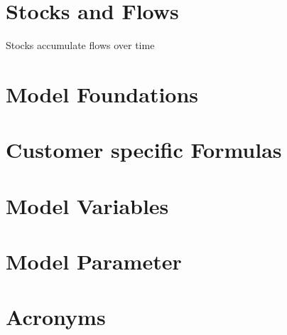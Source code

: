 \section{Stocks and Flows}\label{ch:sfd:sf}

Stocks accumulate flows over time

\section{Model Foundations}\label{ch:sfd:mf}

\section{Customer specific Formulas}\label{ch:sfd:csf}

\section{Model Variables}\label{ch:sfd:mv}

\section{Model Parameter}\label{ch:sfd:mp}


\newpage
\section{Acronyms}

